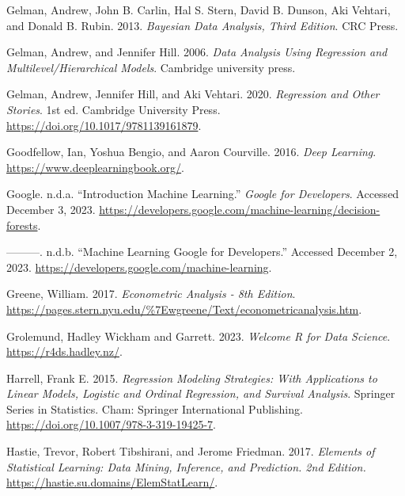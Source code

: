 \documentclass[
  letterpaper,
]{krantz}
\newlength{\cslhangindent}
\newlength{\cslentryspacingunit} %
\newenvironment{CSLReferences}[2] %
 {%
  \setlength{\parindent}{0pt}
  \ifodd #1
  \let\oldpar\par
  \def\par{\hangindent=\cslhangindent\oldpar}
  \fi
  \setlength{\parskip}{#2\cslentryspacingunit}
 }%
 {}
\begin{document}
\begin{CSLReferences}{1}{0}
\leavevmode{}%
Gelman, Andrew, John B. Carlin, Hal S. Stern, David B. Dunson, Aki
Vehtari, and Donald B. Rubin. 2013. \emph{Bayesian {Data} {Analysis},
{Third} {Edition}}. CRC Press.

\leavevmode{}%
Gelman, Andrew, and Jennifer Hill. 2006. \emph{Data Analysis Using
Regression and Multilevel/Hierarchical Models}. Cambridge university
press.

\leavevmode{}%
Gelman, Andrew, Jennifer Hill, and Aki Vehtari. 2020. \emph{Regression
and {Other} {Stories}}. 1st ed. Cambridge University Press.
\url{https://doi.org/10.1017/9781139161879}.

\leavevmode{}%
Goodfellow, Ian, Yoshua Bengio, and Aaron Courville. 2016. \emph{Deep
{Learning}}. \url{https://www.deeplearningbook.org/}.

\leavevmode{}%
Google. n.d.a. {``Introduction {\textbar} {Machine} {Learning}.''}
\emph{Google for Developers}. Accessed December 3, 2023.
\url{https://developers.google.com/machine-learning/decision-forests}.

\leavevmode{}%
---------. n.d.b. {``Machine {Learning} {\textbar} {Google} for
{Developers}.''} Accessed December 2, 2023.
\url{https://developers.google.com/machine-learning}.

\leavevmode{}%
Greene, William. 2017. \emph{Econometric {Analysis} - 8th {Edition}}.
\url{https://pages.stern.nyu.edu/%7Ewgreene/Text/econometricanalysis.htm}.

\leavevmode{}%
Grolemund, Hadley Wickham and Garrett. 2023. \emph{Welcome {\textbar}
{R} for {Data} {Science}}. \url{https://r4ds.hadley.nz/}.

\leavevmode{}%
Harrell, Frank E. 2015. \emph{Regression {Modeling} {Strategies}: {With}
{Applications} to {Linear} {Models}, {Logistic} and {Ordinal}
{Regression}, and {Survival} {Analysis}}. Springer {Series} in
{Statistics}. Cham: Springer International Publishing.
\url{https://doi.org/10.1007/978-3-319-19425-7}.

\leavevmode{}%
Hastie, Trevor, Robert Tibshirani, and Jerome Friedman. 2017.
\emph{Elements of {Statistical} {Learning}: Data Mining, Inference, and
Prediction. 2nd {Edition}.}
\url{https://hastie.su.domains/ElemStatLearn/}.


\end{CSLReferences}
\end{document}

